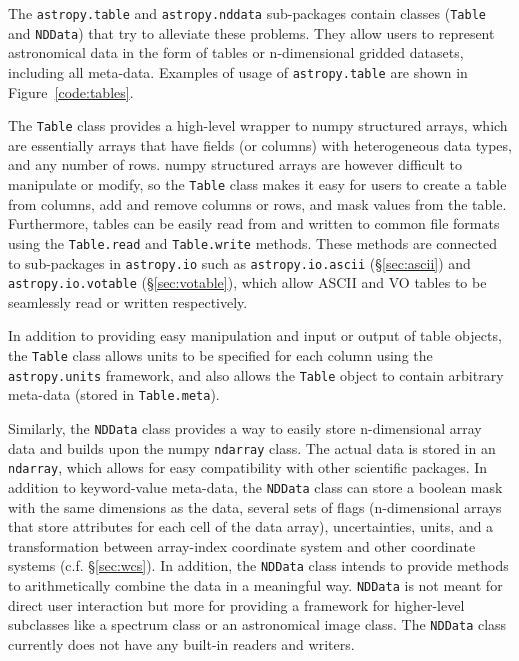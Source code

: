 \documentclass[traditabstract]{aa}
\begin{document}
The \texttt{astropy.table} and \texttt{astropy.nddata} sub-packages contain
classes (\texttt{Table} and \texttt{NDData}) that try to alleviate these
problems. They allow users to represent astronomical data in the form of tables
or n-dimensional gridded datasets, including all meta-data. Examples of usage
of \texttt{astropy.table} are shown in Figure~\ref{code:tables}.

The \texttt{Table} class provides a high-level wrapper to \gls{numpy} structured
arrays, which are essentially arrays that have fields (or columns) with
heterogeneous data types, and any number of rows. \gls{numpy} structured arrays are
however difficult to manipulate or modify, so the \texttt{Table} class makes it
easy for users to create a table from columns, add and remove columns or rows,
and mask values from the table. Furthermore, tables can be easily read from and
written to common file formats using the \texttt{Table.read} and
\texttt{Table.write} methods. These methods are connected to sub-packages in
\texttt{astropy.io} such as \texttt{astropy.io.ascii} (\S\ref{sec:ascii}) and
\texttt{astropy.io.votable} (\S\ref{sec:votable}), which allow ASCII and VO
tables to be seamlessly read or written respectively.

In addition to providing easy manipulation and input or output of table objects,
the \texttt{Table} class allows units to be specified for each column using the
\texttt{astropy.units} framework, and also allows the \texttt{Table} object to
contain arbitrary meta-data (stored in \texttt{Table.meta}).

Similarly, the \texttt{NDData} class provides a way to easily store n-dimensional array
data and builds upon the \gls{numpy} \texttt{ndarray} class. The actual data is
stored in an \texttt{ndarray}, which allows for easy compatibility with
other scientific packages. In addition to keyword-value meta-data, the
\texttt{NDData} class can store a boolean mask with the same dimensions as the
data, several sets of flags (n-dimensional arrays that store attributes for
each cell of the data array), uncertainties, units, and a transformation
between array-index coordinate system and other coordinate systems (c.f.
\S\ref{sec:wcs}). In addition, the \texttt{NDData} class intends to provide
methods to arithmetically combine the data in a meaningful way. \texttt{NDData}
is not meant for direct user interaction but more for providing a framework for
higher-level subclasses like a spectrum class or an astronomical image class.
The \texttt{NDData} class currently does not have any built-in readers and
writers.
\end{document}
